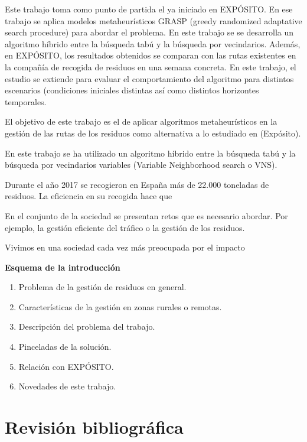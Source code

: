\documentclass[
]{article}
\providecommand{\tightlist}{%
  \setlength{\itemsep}{0pt}\setlength{\parskip}{0pt}}
\begin{document}
Este trabajo toma como punto de partida el ya iniciado en EXPÓSITO. En
ese trabajo se aplica modelos metaheurísticos GRASP (greedy randomized
adaptative search procedure) para abordar el problema. En este trabajo
se se desarrolla un algoritmo híbrido entre la búsqueda tabú y la
búsqueda por vecindarios. Además, en EXPÓSITO, los resultados obtenidos
se comparan con las rutas existentes en la compañía de recogida de
residuos en una semana concreta. En este trabajo, el estudio se extiende
para evaluar el comportamiento del algoritmo para distintos escenarios
(condiciones iniciales distintas así como distintos horizontes
temporales.

El objetivo de este trabajo es el de aplicar algoritmos metaheurísticos
en la gestión de las rutas de los residuos como alternativa a lo
estudiado en (Expósito).

En este trabajo se ha utilizado un algoritmo híbrido entre la búsqueda
tabú y la búsqueda por vecindarios variables (Variable Neighborhood
search o VNS).

Durante el año 2017 se recogieron en España más de 22.000 toneladas de
residuos. La eficiencia en su recogida hace que

En el conjunto de la sociedad se presentan retos que es necesario
abordar. Por ejemplo, la gestión eficiente del tráfico o la gestión de
los residuos.

Vivimos en una sociedad cada vez más preocupada por el impacto

\textbf{Esquema de la introducción}

\begin{enumerate}
\def\labelenumi{\arabic{enumi}.}
\tightlist
\item
  Problema de la gestión de residuos en general.
\item
  Características de la gestión en zonas rurales o remotas.
\item
  Descripción del problema del trabajo.
\item
  Pinceladas de la solución.
\item
  Relación con EXPÓSITO.
\item
  Novedades de este trabajo.
\end{enumerate}

\hypertarget{revisiuxf3n-bibliogruxe1fica}{%
\section{Revisión bibliográfica}\label{revisiuxf3n-bibliogruxe1fica}}
\end{document}
